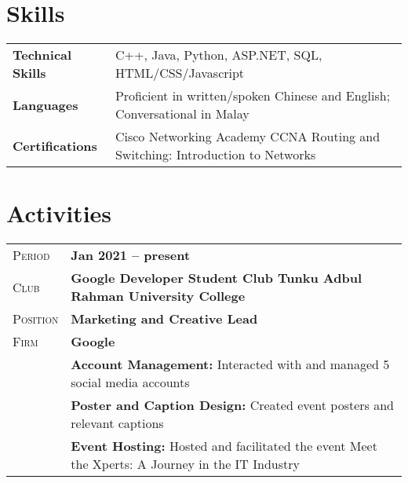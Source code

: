 \documentclass[a4paper, oneside, final]{scrartcl} %
\newcommand{\gray}{\rowcolor[gray]{.90}} %
\begin{document}
\begin{center}
\section{Skills}

\begin{tabular}{@{} >{\bfseries}l @{\hspace{6ex}} l }
Technical Skills &  C++, Java, Python, ASP.NET, SQL, HTML/CSS/Javascript \\
Languages & Proficient in written/spoken Chinese and English; Conversational in Malay \\
Certifications & Cisco Networking Academy CCNA Routing and Switching: Introduction to Networks\\
\end{tabular}



\section{Activities}

\begin{tabularx}{0.97\linewidth}{>{\raggedleft\scshape}p{2cm}X}
\gray Period & \textbf{Jan 2021 – present}\\
\gray Club & \textbf{Google Developer Student Club Tunku Adbul Rahman University College}\\
\gray Position & \textbf{Marketing and Creative Lead}\\
\gray Firm & \textbf{Google}\\
& \textbf{\small Account Management: }{\small Interacted with and managed 5 social media accounts} \\
& \textbf{\small Poster and Caption Design: }{\small Created event posters and relevant captions} \\
& \textbf{\small Event Hosting: }{\small Hosted and facilitated the event Meet the Xperts: A Journey in the IT Industry} \\
\end{tabularx}

\end{center}
\end{document}
